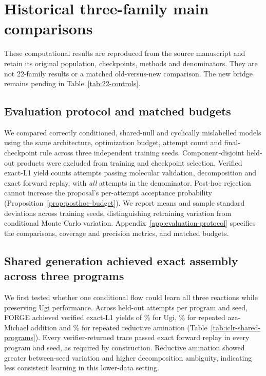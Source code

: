 \section{Historical three-family main comparisons}
\label{app:historical-main}
These computational results are reproduced from the source manuscript and retain its original
population, checkpoints, methods and denominators. They are not 22-family results or a matched
old-versus-new comparison. The new bridge remains pending in Table~\ref{tab:22-controls}.

\subsection{Evaluation protocol and matched budgets}
We compared correctly conditioned, shared-null and cyclically mislabelled models using the same
architecture, optimization budget, attempt count and final-checkpoint rule across three independent
training seeds. Component-disjoint held-out products were excluded from training and checkpoint
selection. Verified exact-L1 yield counts attempts passing molecular validation, decomposition and
exact forward replay, with \emph{all} attempts in the denominator. Post-hoc rejection cannot increase
the proposal's per-attempt acceptance probability (Proposition~\ref{prop:posthoc-budget}). We report
means and sample standard deviations across training seeds, distinguishing retraining variation from
conditional Monte Carlo variation. Appendix~\ref{app:evaluation-protocol} specifies the comparisons,
coverage and precision metrics, and matched budgets.

\subsection{Shared generation achieved exact assembly across three programs}
We first tested whether one conditional flow could learn all three reactions while preserving Ugi
performance. Across
\ForgeProseAttemptsPerProgram{} held-out attempts per program and seed, FORGE achieved verified
exact-L1 yields of \ForgeTableOneConditionedUgiYield\% for Ugi,
\ForgeTableOneConditionedBLYield\% for repeated aza-Michael addition and
\ForgeTableOneConditionedLXYield\% for repeated reductive amination
(Table~\ref{tab:iclr-shared-programs}). Every verifier-returned trace passed exact forward replay in
every program and seed, as required by construction. Reductive amination showed greater between-seed
variation and higher decomposition ambiguity, indicating less consistent learning in this lower-data
setting.

